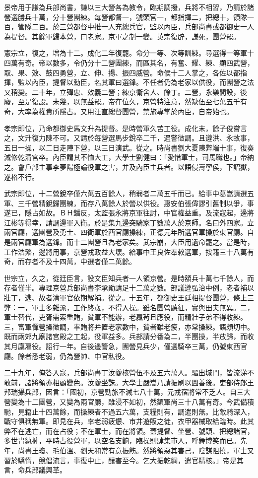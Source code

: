 景帝用于謙為兵部尚書，謙以三大營各為教令，臨期調撥，兵將不相習，乃請於諸營選勝兵十萬，分十營團練。每營都督一，號頭官一，都指揮二，把總十，領隊一百，管隊二百。於三營都督中推一人充總兵官，監以內臣，兵部尚書或都御史一人為提督。其餘軍歸本營，曰老家。京軍之制一變。英宗復辟，謙死，團營罷。

憲宗立，復之，增為十二。成化二年復罷。命分一等、次等訓練。尋選得一等軍十四萬有奇。帝以數多，令仍分十二營團練，而區其名，有奮、耀、練、顯四武營，取、果、效、鼓四勇營，立、伸、揚、振四威營。命侯十二人掌之，各佐以都指揮，監以內臣，提督以勳臣，名其軍曰選鋒。不任者仍為老家以供役，而團營之法又稍變。二十年，立殫忠、效義二營；練京衛舍人、餘丁。二營，永樂間設，後廢，至是復設。未幾，以無益罷。帝在位久，京營特注意，然缺伍至七萬五千有奇，大率為權貴所隱占。又用汪直總督團營，禁旅專掌於內臣，自帝始也。

孝宗即位，乃命都御史馬文升為提督。是時營軍久苦工役。成化末，餘子俊嘗言之，文升復力陳不可。又請於每營選馬步銳卒二千，遇警徵調。且遵洪、永故事，五日一操，以二日走陣下營，以三日演武。從之。時尚書劉大夏陳弊端十事，復奏減修乾清宮卒。內臣謂其不恤大工，大學士劉健曰：「愛惜軍士，司馬職也。」帝納之。會戶部主事李夢陽極論役軍之害，并及內臣主兵者。以語侵壽寧侯，下詔獄，遂格不行。

武宗即位，十二營銳卒僅六萬五百餘人，稍弱者二萬五千而已。給事中葛嵩請選五軍、三千營精銳歸團練，而存八萬餘人於營以供役。惠安伯張偉謬引舊制以爭，事遂已，隱占如故。ＢＨ鐇反，太監張永將京軍往討，中官權益重。及流寇起，邊將江彬等得幸，請調邊軍入衛。於是集九邊突騎家丁數萬人於京師。名曰外四家。立兩官廳，選團營及勇士、四衛軍於西官廳操練，正德元年所選官軍操於東官廳。自是兩官廳軍為選鋒。而十二團營且為老家矣。武宗崩，大臣用遺命罷之。當是時，工作浩繁，邊將用事，京營戎政益大壞。給事中王良佐奉敕選軍，按籍三十八萬有奇，而存者不及十四萬，中選者僅二萬餘。

世宗立，久之，從廷臣言，設文臣知兵者一人領京營。是時額兵十萬七千餘人，而存者僅半。專理京營兵部尚書李承勛請足十二萬之數。部議遵弘治中例，老者補以壯丁，逃、故者清軍官依期解補。從之。十五年，都御史王廷相提督團營，條上三弊：一，軍士多雜派，工作終歲，不得入操。雖名團營聽征，實與田夫無異。二，軍士替代，吏胥需索重賄，貧軍不能辦，老羸茍且應役，而精壯子弟不得收練。三，富軍憚營操徵調，率賄將弁置老家數中，貧者雖老疲，亦常操練。語頗切中。既而兩郊九廟諸宮殿之工起，役軍益多。兵部請分番為二，半團操，半放歸，而收其月廩雇役。詔行一年。自後邊警急，團營見兵少，僅選騎卒三萬，仍號東西官廳。餘者悉老弱，仍為營帥、中官私役。

二十九年，俺答入寇，兵部尚書丁汝夔核營伍不及五六萬人。驅出城門，皆流涕不敢前，諸將領亦相顧變色。汝夔坐誅。大學士嚴嵩乃請振刷以圖善後。吏部侍郎王邦瑞攝兵部，因言：「國初，京營勁旅不減七八十萬，元戎宿將常不乏人。自三大營變為十二團營，又變為兩官廳，雖浸不如初，然額軍尚三十八萬有奇。今武備積馳，見籍止十四萬餘，而操練者不過五六萬，支糧則有，調遣則無。比敵騎深入，戰守俱稱無軍。即見在兵，率老弱疲憊、市井遊販之徒，衣甲器械取給臨時。此其弊不在逃亡，而在占役；不在軍士，而在將領。蓋提督、坐營、號頭、把總諸官，多世胄紈褲，平時占役營軍，以空名支餉，臨操則肆集市人，呼舞博笑而已。先年，尚書王瓊、毛伯溫、劉天和常有意振飭。然將領惡其害己，陰謀阻撓，軍士又習於驕惰，競倡流言，事復中止，釀害至今。乞大振乾綱，遣官精核。」帝是其言，命兵部議興革。

